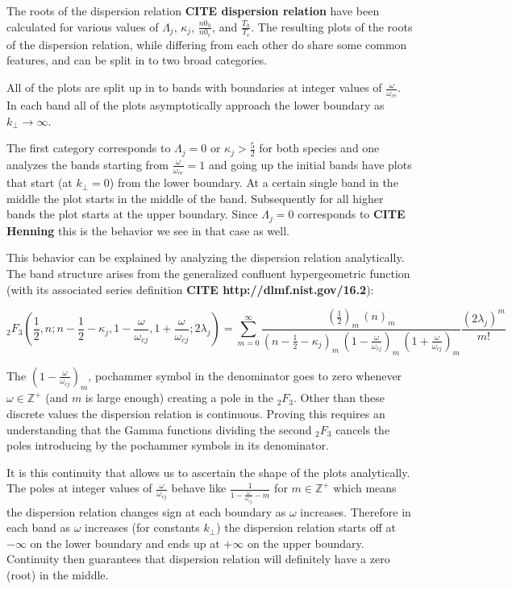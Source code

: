 \documentclass[12pt,a4paper]{article}
\begin{document}
    The roots of the dispersion relation \textbf{CITE dispersion relation} have been calculated for various values of $\Lambda_j$, $\kappa_j$, $\frac{n0_h}{n0_e}$, and $\frac{T_h}{T_c}$.
    The resulting plots of the roots of the dispersion relation, while differing from each other do share some common features, and can be split in to two broad categories.

    All of the plots are split up in to bands with boundaries at integer values of $\frac{\omega}{\omega_{ce}}$.
    In each band all of the plots asymptotically approach the lower boundary as $k_\perp \rightarrow \infty$.

    The first category corresponds to $\Lambda_j = 0$ or $\kappa_j > \frac{5}{2}$ for both species and one analyzes the bands starting from $\frac{\omega}{\omega_{ce}} = 1$ and going up the initial bands have plots that start (at $k_\perp = 0$) from the lower boundary. At a certain single band in the middle the plot starts in the middle of the band.
    Subsequently for all higher bands the plot starts at the upper boundary.
    Since $\Lambda_j = 0$ corresponds to \textbf{CITE Henning} this is the behavior we see in that case as well.

    This behavior can be explained by analyzing the dispersion relation analytically.
    The band structure arises from the generalized confluent hypergeometric function (with its associated series definition \textbf{CITE http://dlmf.nist.gov/16.2}):

    \begin{equation}
        _2F_3\left(\frac{1}{2}, n; n - \frac{1}{2} - \kappa_j, 1 - \frac{\omega}{\omega_{cj}}, 1 + \frac{\omega}{\omega_{cj}}; 2 \lambda_j \right) = \sum_{m = 0}^{\infty} \frac{(\frac{1}{2})_m \, (n)_m}{(n - \frac{1}{2} - \kappa_j)_m \, (1 - \frac{\omega}{\omega_{cj}})_m \, (1 + \frac{\omega}{\omega_{cj}})_m} \frac{(2 \lambda_j)^m}{m!}
    \end{equation}

    The $(1 - \frac{\omega}{\omega_{cj}})_m$, pochammer symbol in the denominator goes to zero whenever $\omega \in \mathbb{Z}^+$ (and $m$ is large enough) creating a pole in the $_2F_3$.
    Other than these discrete values the dispersion relation is continuous.
    Proving this requires an understanding that the Gamma functions dividing the second $_2F_3$ cancels the poles introducing by the pochammer symbols in its denominator.

    It is this continuity that allows us to ascertain the shape of the plots analytically. The poles at integer values of $\frac{\omega}{\omega_{cj}}$ behave like $\frac{1}{1 - \frac{\omega}{\omega_{cj}} - m}$ for $m \in \mathbb{Z}^+$ which means the dispersion relation changes sign at each boundary as $\omega$ increases. Therefore in each band as $\omega$ increases (for constants $k_\perp$) the dispersion relation starts off at $-\infty$ on the lower boundary and ends up at $+\infty$ on the upper boundary. Continuity then guarantees that dispersion relation will definitely have a zero (root) in the middle.
\end{document}

